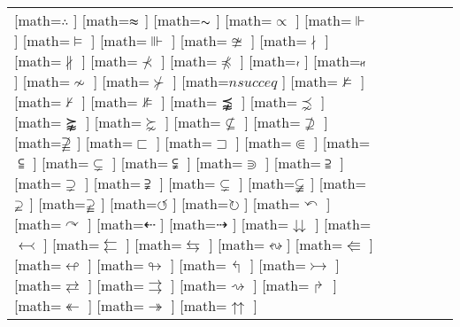 \documentclass{standalone}
\begin{document}
\begin{tabular}{ll|ll|ll}
\makemath{∴}[math=$\therefore$     ]
\makemath{}[math=$\thickapprox$   ]
\makemath{}[math=$\thicksim$      ]
\makemath{}[math=$\varpropto$     ]
\makemath{⊩}[math=$\Vdash$         ]
\makemath{⊨}[math=$\vDash$         ]
\makemath{⊪}[math=$\Vvdash$        ]
\midrule%
\makemath{≇}[math=$\ncong$          ]
\makemath{∤}[math=$\nmid$           ]
\makemath{∦}[math=$\nparallel$      ]
\makemath{⊀}[math=$\nprec$          ]
\makemath{}[math=$\npreceq$        ]
\makemath{}[math=$\nshortmid$      ]
\makemath{}[math=$\nshortparallel$ ]
\makemath{≁}[math=$\nsim$           ]
\makemath{⊁}[math=$\nsucc$          ]
\makemath{}[math=$nsucceq$         ]
\makemath{⊭}[math=$\nvDash$         ]
\makemath{⊬}[math=$\nvdash$         ]
\makemath{⊯}[math=$\nVDash$         ]
\makemath{⪹}[math=$\precnapprox$    ]
\makemath{⋨}[math=$\precnsim$       ]
\makemath{⪺}[math=$\succnapprox$    ]
\makemath{⋩}[math=$\succnsim$       ]
\midrule%
\makemath{⊈}[math=$\nsubseteq$     ]
\makemath{⊉}[math=$\nsupseteq$     ]
\makemath{}[math=$\nsupseteqq$    ]
\makemath{⊏}[math=$\sqsubset$      ]
\makemath{⊐}[math=$\sqsupset$      ]
\makemath{⋐}[math=$\Subset$        ]
\makemath{⫅}[math=$\subseteqq$     ]
\makemath{⊊}[math=$\subsetneq$     ]
\makemath{⫋}[math=$\subsetneqq$    ]
\makemath{⋑}[math=$\Supset$        ]
\makemath{⫆}[math=$\supseteqq$     ]
\makemath{⊋}[math=$\supsetneq$     ]
\makemath{⫌}[math=$\supsetneqq$    ]
\makemath{}[math=$\varsubsetneq$  ]
\makemath{}[math=$\varsubsetneqq$ ]
\makemath{}[math=$\varsupsetneq$  ]
\makemath{}[math=$\varsupsetneqq$ ]
\midrule%
\makemath{⟲}[math=$\circlearrowleft$    ]
\makemath{⟳}[math=$\circlearrowright$   ]
\makemath{↶}[math=$\curvearrowleft$     ]
\makemath{↷}[math=$\curvearrowright$    ]
\makemath{⇠}[math=$\dashleftarrow$      ]
\makemath{⇢}[math=$\dashrightarrow$     ]
\makemath{⇊}[math=$\downdownarrows$     ]
\makemath{↢}[math=$\leftarrowtail$      ]
\makemath{⇇}[math=$\leftleftarrows$     ]
\makemath{⇆}[math=$\leftrightarrows$    ]
\makemath{↭}[math=$\leftrightsquigarrow$]
\makemath{⇚}[math=$\Lleftarrow$         ]
\makemath{↫}[math=$\looparrowleft$      ]
\makemath{↬}[math=$\looparrowright$     ]
\makemath{↰}[math=$\Lsh$                ]
\makemath{↣}[math=$\rightarrowtail$     ]
\makemath{⇄}[math=$\rightleftarrows$    ]
\makemath{⇒}[math=$\rightrightarrows$   ]
\makemath{⇝}[math=$\rightsquigarrow$    ]
\makemath{↱}[math=$\Rsh$                ]
\makemath{↞}[math=$\twoheadleftarrow$   ]
\makemath{↠}[math=$\twoheadrightarrow$  ]
\makemath{⇈}[math=$\upuparrows$         ]


\bottomrule
\end{tabular}
\end{document}
